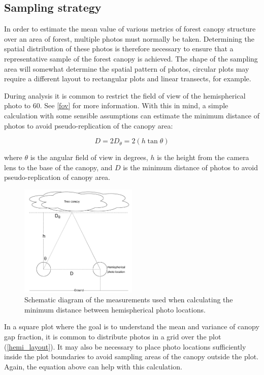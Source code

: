 \documentclass[11pt,a4paper]{article}
\begin{document}
\subsection{Sampling strategy}

In order to estimate the mean value of various metrics of forest canopy structure over an area of forest, multiple photos must normally be taken. Determining the spatial distribution of these photos is therefore necessary to ensure that a representative sample of the forest canopy is achieved. The shape of the sampling area will somewhat determine the spatial pattern of photos, circular plots may require a different layout to rectangular plots and linear transects, for example.

During analysis it is common to restrict the field of view of the hemispherical photo to 60\textdegree{}. See \autoref{fov} for more information. With this in mind, a simple calculation with some sensible assumptions can estimate the minimum distance of photos to avoid pseudo-replication of the canopy area:

\begin{equation}
	D = 2D_{\theta} = 2(h \tan{\theta})
\end{equation}

where $\theta$ is the angular field of view in degrees, $h$ is the height from the camera lens to the base of the canopy, and $D$ is the minimum distance of photos to avoid pseudo-replication of canopy area.

\begin{figure}[H]
\centering
	\includegraphics[width=0.5\textwidth]{canopy_trig.drawio}
	\caption{Schematic diagram of the measurements used when calculating the minimum distance between hemispherical photo locations.}
	\label{canopy_trig}
\end{figure}

In a square plot where the goal is to understand the mean and variance of canopy gap fraction, it is common to distribute photos in a grid over the plot (\autoref{hemi_layout}). It may also be necessary to place photo locations sufficiently inside the plot boundaries to avoid sampling areas of the canopy outside the plot. Again, the equation above can help with this calculation.
\end{document}
